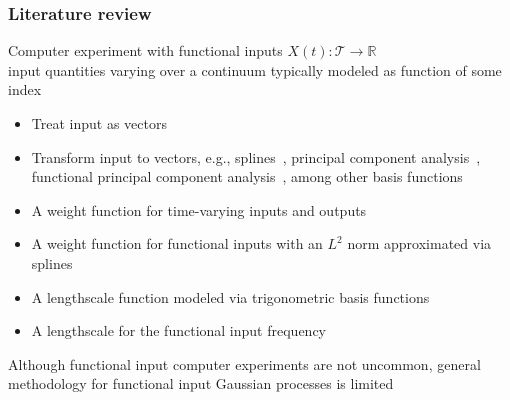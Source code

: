 \documentclass{snedecorbeamer}
\begin{document}
\begin{frame}%
  \label{frm:litrev}
  \frametitle{Literature review}

  Computer experiment with functional inputs $X(t):
  \mathcal{T}\to\mathbb{R}$ \\
  input quantities varying over a continuum typically modeled as function of
  some index

  \begin{itemize}
  \item Treat input as vectors~\cite{iooss2009}
  \item Transform input to vectors, e.g.,
    splines~\cite{betancourt2020,betancourt2020a}, principal component
    analysis~\cite{nanty2016}, functional principal component
    analysis~\cite{wang2017,wang2019}, among other basis
    functions~\cite{tan2019,li2021,striegel2022}
  \item A weight function for time-varying inputs and outputs~\cite{morris2012}
  \item A weight function for functional inputs with an $L^2$ norm approximated
    via splines~\cite{muehlenstaedt2017}
  \item A lengthscale function modeled via trigonometric basis
    functions~\cite{kuttubekova2019}
  \item A lengthscale for the functional input frequency~\cite{Chen2021}
  \end{itemize}

  \vfill{}
  Although functional input computer experiments are not uncommon,
  general methodology for functional input Gaussian processes is limited
\end{frame}
\end{document}
